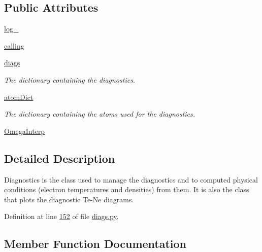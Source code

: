 \subsection*{Public Attributes}
\begin{DoxyCompactItemize}
\item 
\hyperlink{classpyneb_1_1core_1_1diags_1_1_diagnostics_a20b70abfa1fd458af2b797e06da01ed0}{log\+\_\+}
\item 
\hyperlink{classpyneb_1_1core_1_1diags_1_1_diagnostics_a07dce673fec8b2383ef411ab94b0b2fe}{calling}
\item 
\hyperlink{classpyneb_1_1core_1_1diags_1_1_diagnostics_a0c0f7e36097677f61a6a14a0c3127b02}{diags}
\begin{DoxyCompactList}\small\item\em The dictionary containing the diagnostics. \end{DoxyCompactList}\item 
\hyperlink{classpyneb_1_1core_1_1diags_1_1_diagnostics_a36301f268745b33abe6cfeb3e41a6356}{atom\+Dict}
\begin{DoxyCompactList}\small\item\em The dictionary containing the atoms used for the diagnostics. \end{DoxyCompactList}\item 
\hyperlink{classpyneb_1_1core_1_1diags_1_1_diagnostics_acfd0638b293790832bcee3cd9f3ec342}{Omega\+Interp}
\end{DoxyCompactItemize}


\subsection{Detailed Description}
\begin{DoxyVerb}Diagnostics is the class used to manage the diagnostics and to computed physical conditions 
    (electron temperatures and densities) from them. 
It is also the class that plots the diagnostic Te-Ne diagrams.\end{DoxyVerb}
 

Definition at line \hyperlink{diags_8py_source_l00152}{152} of file \hyperlink{diags_8py_source}{diags.\+py}.



\subsection{Member Function Documentation}
\hypertarget{classpyneb_1_1core_1_1diags_1_1_diagnostics_aab98440027bccb4e851da6803f0ee398}{}
